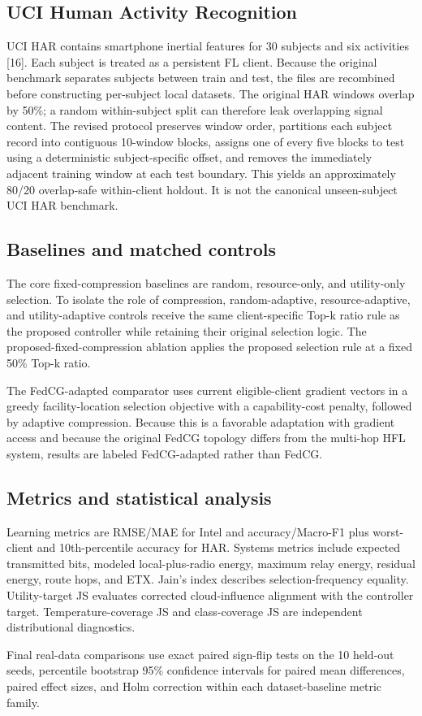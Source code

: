\documentclass[11pt]{article}
\begin{document}
\subsection*{UCI Human Activity Recognition}
UCI HAR contains smartphone inertial features for 30 subjects and six activities [16]. Each subject is treated as a persistent FL client. Because the original benchmark separates subjects between train and test, the files are recombined before constructing per-subject local datasets. The original HAR windows overlap by 50\%; a random within-subject split can therefore leak overlapping signal content. The revised protocol preserves window order, partitions each subject record into contiguous 10-window blocks, assigns one of every five blocks to test using a deterministic subject-specific offset, and removes the immediately adjacent training window at each test boundary. This yields an approximately 80/20 overlap-safe within-client holdout. It is not the canonical unseen-subject UCI HAR benchmark.\par
\subsection*{Baselines and matched controls}
The core fixed-compression baselines are random, resource-only, and utility-only selection. To isolate the role of compression, random-adaptive, resource-adaptive, and utility-adaptive controls receive the same client-specific Top-k ratio rule as the proposed controller while retaining their original selection logic. The proposed-fixed-compression ablation applies the proposed selection rule at a fixed 50\% Top-k ratio.\par
The FedCG-adapted comparator uses current eligible-client gradient vectors in a greedy facility-location selection objective with a capability-cost penalty, followed by adaptive compression. Because this is a favorable adaptation with gradient access and because the original FedCG topology differs from the multi-hop HFL system, results are labeled FedCG-adapted rather than FedCG.\par
\subsection*{Metrics and statistical analysis}
Learning metrics are RMSE/MAE for Intel and accuracy/Macro-F1 plus worst-client and 10th-percentile accuracy for HAR. Systems metrics include expected transmitted bits, modeled local-plus-radio energy, maximum relay energy, residual energy, route hops, and ETX. Jain's index describes selection-frequency equality. Utility-target JS evaluates corrected cloud-influence alignment with the controller target. Temperature-coverage JS and class-coverage JS are independent distributional diagnostics.\par
Final real-data comparisons use exact paired sign-flip tests on the 10 held-out seeds, percentile bootstrap 95\% confidence intervals for paired mean differences, paired effect sizes, and Holm correction within each dataset-baseline metric family.\par
\end{document}

